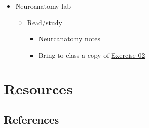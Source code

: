 \documentclass[
  letterpaper,
  DIV=11,
  numbers=noendperiod]{scrartcl}
\providecommand{\tightlist}{%
  \setlength{\itemsep}{0pt}\setlength{\parskip}{0pt}}
\begin{document}
\begin{itemize}
\tightlist
\item
  Neuroanatomy lab

  \begin{itemize}
  \tightlist
  \item
    Read/study

    \begin{itemize}
    \tightlist
    \item
      Neuroanatomy \href{../resources/anatomy.qmd}{notes}
    \item
      Bring to class a copy of \href{exercises/ex02.pdf}{Exercise 02}
    \end{itemize}
  \end{itemize}
\end{itemize}

\section{Resources}\label{resources}

\subsection*{References}\label{references}
\end{document}
